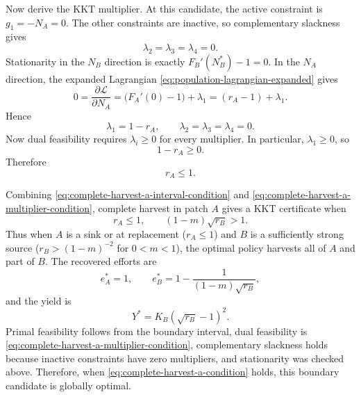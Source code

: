 \documentclass{article}
\numberwithin{equation}{section}
\begin{document}
Now derive the KKT multiplier. At this candidate, the active constraint is
$g_1=-N_A=0$. The other constraints are inactive, so complementary
slackness gives
\begin{equation*}
    \lambda_2=\lambda_3=\lambda_4=0.
\end{equation*}
Stationarity in the $N_B$ direction is exactly
$F_B'(N_B^*)-1=0$. In the $N_A$ direction, the expanded Lagrangian
\eqref{eq:population-lagrangian-expanded} gives
\begin{equation*}
    0=\frac{\partial\mathcal L}{\partial N_A}
    =
    \bigl(F_A'(0)-1\bigr)+\lambda_1
    =
    (r_A-1)+\lambda_1.
\end{equation*}
Hence
\begin{equation}
    \label{eq:complete-harvest-a-multipliers}
    \lambda_1=1-r_A,
    \qquad
    \lambda_2=\lambda_3=\lambda_4=0.
\end{equation}
Now dual feasibility requires $\lambda_i\geq0$ for every multiplier. In
particular, $\lambda_1\geq0$, so
\begin{equation*}
    1-r_A\geq0.
\end{equation*}
Therefore
\begin{equation}
    \label{eq:complete-harvest-a-multiplier-condition}
    r_A\leq1.
\end{equation}

Combining \eqref{eq:complete-harvest-a-interval-condition} and
\eqref{eq:complete-harvest-a-multiplier-condition}, complete harvest
in patch $A$ gives a KKT certificate when
\begin{equation}
    \label{eq:complete-harvest-a-condition}
    r_A\leq1,
    \qquad
    (1-m)\sqrt{r_B}>1.
\end{equation}
Thus when $A$ is a sink or at replacement ($r_A\leq1$) and $B$ is a
sufficiently strong source ($r_B>(1-m)^{-2}$ for $0<m<1$), the optimal
policy harvests all of $A$ and part of $B$. The recovered efforts are
\begin{equation}
    \label{eq:complete-harvest-a-efforts}
    e_A^*=1,
    \qquad
    e_B^*=1-\frac{1}{(1-m)\sqrt{r_B}},
\end{equation}
and the yield is
\begin{equation}
    \label{eq:complete-harvest-a-yield}
    Y^*=K_B(\sqrt{r_B}-1)^2.
\end{equation}
Primal feasibility follows from the boundary interval, dual feasibility is
\eqref{eq:complete-harvest-a-multiplier-condition}, complementary
slackness holds because inactive constraints have zero multipliers, and
stationarity was checked above. Therefore, when
\eqref{eq:complete-harvest-a-condition} holds, this boundary
candidate is globally optimal.
\end{document}
